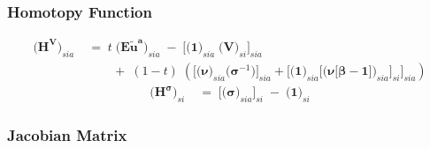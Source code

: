 \documentclass[11pt,fleqn]{article}
\newcommand{\bsigma}{\bm{\sigma}}
\newcommand{\bbeta}{\bm{\beta}}
\newcommand{\bV}{\bm{V}}
\newcommand{\bnu}{\bm{\nu}}
\newcommand{\bone}{\bm{1}}
\newcommand{\tu}{\tilde{u}}
\begin{document}
\subsubsection*{Homotopy Function}

\begin{align*}
	\biggl( \bm{H^{V}} \biggr)_{sia} & \;=\; 
		t \; \biggl( \bm{{E\tu^{a}}} \biggr)_{sia} \;-\; \Biggl[ \biggl( \bone \biggr)_{sia} \; \biggl( \bV \biggr)_{si} \Biggr]_{sia} \\
		& \qquad \;+\; (1-t) \; \left( \Biggl[ \biggl( \bnu \biggr)_{sia} \biggl( \bsigma^{-1} \biggr) \Biggr]_{sia} + \Biggl[ \biggl( \bone \biggr)_{sia} \Biggl[ \biggl( \bnu\bigl[\bbeta-\bone\bigr] \biggr)_{sia} \Biggr]_{si} \Biggr]_{sia} \right)
\end{align*}
\begin{align*}
	\biggl( \bm{H^{\sigma}} \biggr)_{si} & \;=\; 
		\Biggl[ \biggl( \bsigma \biggr)_{sia} \Biggr]_{si} \;-\; \biggl( \bone \biggr)_{si} 
\end{align*}


\subsubsection*{Jacobian Matrix} 
\end{document}
